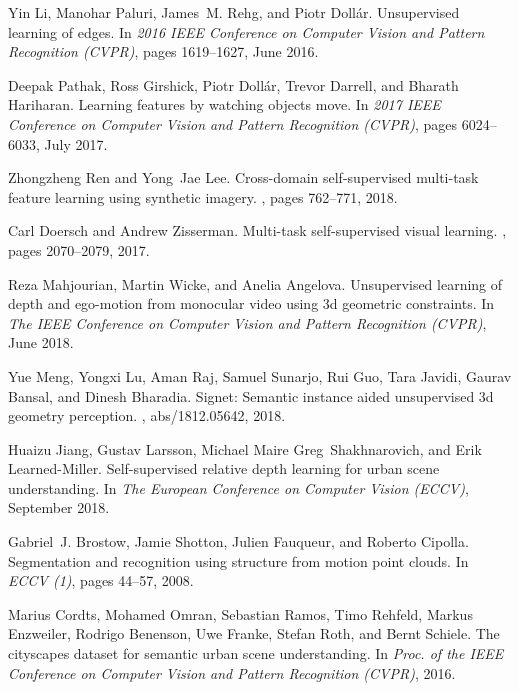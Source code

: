 \documentclass{article}
\begin{document}
{\begin{thebibliography}{10}
Yin Li, Manohar Paluri, James~M. Rehg, and Piotr Dollár.
\newblock Unsupervised learning of edges.
\newblock In {\em 2016 IEEE Conference on Computer Vision and Pattern
  Recognition (CVPR)}, pages 1619--1627, June 2016.

Deepak Pathak, Ross Girshick, Piotr Dollár, Trevor Darrell, and Bharath
  Hariharan.
\newblock Learning features by watching objects move.
\newblock In {\em 2017 IEEE Conference on Computer Vision and Pattern
  Recognition (CVPR)}, pages 6024--6033, July 2017.

Zhongzheng Ren and Yong~Jae Lee.
\newblock Cross-domain self-supervised multi-task feature learning using
  synthetic imagery.
, pages 762--771, 2018.

Carl Doersch and Andrew Zisserman.
\newblock Multi-task self-supervised visual learning.
,
  pages 2070--2079, 2017.

Reza Mahjourian, Martin Wicke, and Anelia Angelova.
\newblock Unsupervised learning of depth and ego-motion from monocular video
  using 3d geometric constraints.
\newblock In {\em The IEEE Conference on Computer Vision and Pattern
  Recognition (CVPR)}, June 2018.

Yue Meng, Yongxi Lu, Aman Raj, Samuel Sunarjo, Rui Guo, Tara Javidi, Gaurav
  Bansal, and Dinesh Bharadia.
\newblock Signet: Semantic instance aided unsupervised 3d geometry perception.
, abs/1812.05642, 2018.

Huaizu Jiang, Gustav Larsson, Michael Maire Greg~Shakhnarovich, and Erik
  Learned-Miller.
\newblock Self-supervised relative depth learning for urban scene
  understanding.
\newblock In {\em The European Conference on Computer Vision (ECCV)}, September
  2018.

Gabriel~J. Brostow, Jamie Shotton, Julien Fauqueur, and Roberto Cipolla.
\newblock Segmentation and recognition using structure from motion point
  clouds.
\newblock In {\em ECCV (1)}, pages 44--57, 2008.

Marius Cordts, Mohamed Omran, Sebastian Ramos, Timo Rehfeld, Markus Enzweiler,
  Rodrigo Benenson, Uwe Franke, Stefan Roth, and Bernt Schiele.
\newblock The cityscapes dataset for semantic urban scene understanding.
\newblock In {\em Proc. of the IEEE Conference on Computer Vision and Pattern
  Recognition (CVPR)}, 2016.


\end{thebibliography}}
\end{document}
